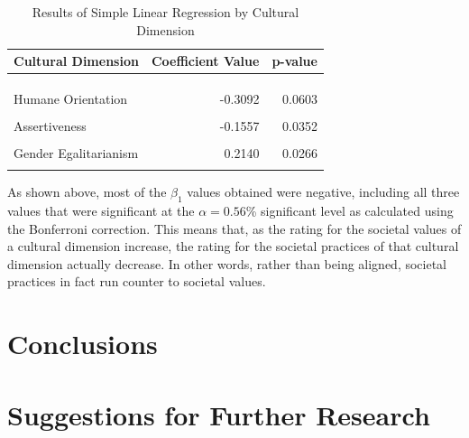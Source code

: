 \documentclass[
]{article}
\begin{document}
\begin{table}[!h]

\caption{\label{tab:SPV SLR Table}Results of Simple Linear Regression by Cultural Dimension}
\centering
\begin{tabular}[t]{lrr}
\toprule
Cultural Dimension & Coefficient Value & p-value\\
\midrule
\cellcolor[HTML]{E5F5E0}{Power Distance} & \cellcolor[HTML]{E5F5E0}{-0.6240} & \cellcolor[HTML]{E5F5E0}{0.0000}\\
\cellcolor[HTML]{E5F5E0}{Uncertainty Avoidance} & \cellcolor[HTML]{E5F5E0}{-0.6059} & \cellcolor[HTML]{E5F5E0}{0.0000}\\
\cellcolor[HTML]{E5F5E0}{Institutional Collectivism} & \cellcolor[HTML]{E5F5E0}{-0.4619} & \cellcolor[HTML]{E5F5E0}{0.0000}\\
Humane Orientation & -0.3092 & 0.0603\\
\cellcolor[HTML]{F0F0F0}{Future Orientation} & \cellcolor[HTML]{F0F0F0}{-0.2545} & \cellcolor[HTML]{F0F0F0}{0.0247}\\
\addlinespace
Assertiveness & -0.1557 & 0.0352\\
\cellcolor[HTML]{F0F0F0}{Performance Orientation} & \cellcolor[HTML]{F0F0F0}{-0.1223} & \cellcolor[HTML]{F0F0F0}{0.1861}\\
Gender Egalitarianism & 0.2140 & 0.0266\\
\cellcolor[HTML]{F0F0F0}{In-group Collectivism} & \cellcolor[HTML]{F0F0F0}{0.6347} & \cellcolor[HTML]{F0F0F0}{0.0074}\\
\bottomrule
\end{tabular}
\end{table}

As shown above, most of the \(\beta_1\) values obtained were negative,
including all three values that were significant at the
\(\alpha = 0.56\)\% significant level as calculated using the Bonferroni
correction. This means that, as the rating for the societal values of a
cultural dimension increase, the rating for the societal practices of
that cultural dimension actually decrease. In other words, rather than
being aligned, societal practices in fact run counter to societal
values.

\hypertarget{conclusions}{%
\section{Conclusions}\label{conclusions}}

\hypertarget{suggestions-for-further-research}{%
\section{Suggestions for Further
Research}\label{suggestions-for-further-research}}
\end{document}
